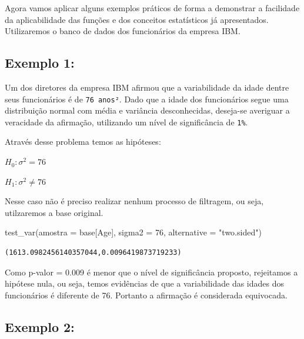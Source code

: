 \documentclass[
  letterpaper,
  DIV=11,
  numbers=noendperiod]{scrreprt}
\newenvironment{Shaded}{\begin{snugshade}}{\end{snugshade}}
\newcommand{\DecValTok}[1]{\textcolor[rgb]{0.68,0.00,0.00}{#1}}
\newcommand{\NormalTok}[1]{\textcolor[rgb]{0.00,0.23,0.31}{#1}}
\newcommand{\OperatorTok}[1]{\textcolor[rgb]{0.37,0.37,0.37}{#1}}
\newcommand{\StringTok}[1]{\textcolor[rgb]{0.13,0.47,0.30}{#1}}
\begin{document}
Agora vamos aplicar alguns exemplos práticos de forma a demonstrar a
facilidade da aplicabilidade das funções e dos conceitos estatísticos já
apresentados. Utilizaremos o banco de dados dos funcionários da empresa
IBM.

\hypertarget{exemplo-1-2}{%
\subsection{Exemplo 1:}\label{exemplo-1-2}}

Um dos diretores da empresa IBM afirmou que a variabilidade da idade
dentre seus funcionários é de \texttt{76\ anos²}. Dado que a idade dos
funcionários segue uma distribuição normal com média e variância
desconhecidas, deseja-se averiguar a veracidade da afirmação, utilizando
um nível de significância de \texttt{1\%}.

Através desse problema temos as hipóteses:

\(H_{0} : \sigma^{2} = 76\)

\(H_{1} : \sigma^{2} \neq 76\)

Nesse caso não é preciso realizar nenhum processo de filtragem, ou seja,
utilzaremos a base original.

\begin{Shaded}
\begin{Highlighting}[]
\NormalTok{test\_var(amostra }\OperatorTok{=}\NormalTok{ base[}\StringTok{\textquotesingle{}Age\textquotesingle{}}\NormalTok{], sigma2 }\OperatorTok{=} \DecValTok{76}\NormalTok{, alternative }\OperatorTok{=} \StringTok{"two.sided"}\NormalTok{)}
\end{Highlighting}
\end{Shaded}

\begin{tcolorbox}[enhanced jigsaw, breakable, leftrule=.75mm, left=2mm, opacityback=0, bottomrule=.15mm, toprule=.15mm, rightrule=.15mm, arc=.35mm, colback=white]

\begin{verbatim}
(1613.0982456140357044,0.0096419873719233)
\end{verbatim}

\end{tcolorbox}

Como p-valor = 0.009 é menor que o nível de significância proposto,
rejeitamos a hipótese nula, ou seja, temos evidências de que a
variabilidade das idades dos funcionários é diferente de 76. Portanto a
afirmação é considerada equivocada.

\hypertarget{exemplo-2-2}{%
\subsection{Exemplo 2:}\label{exemplo-2-2}}
\end{document}
